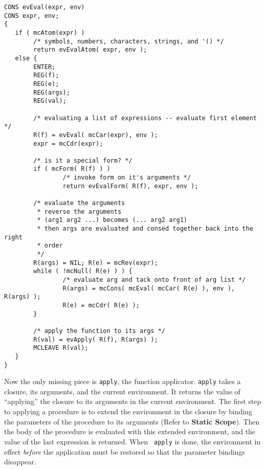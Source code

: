\begin{verbatim}
CONS evEval(expr, env)
CONS expr, env;
{
   if ( mcAtom(expr) )
        /* symbols, numbers, characters, strings, and '() */
        return evEvalAtom( expr, env );
   else {
        ENTER;
        REG(f);
        REG(e);
        REG(args);
        REG(val);

        /* evaluating a list of expressions -- evaluate first element */
        R(f) = evEval( mcCar(expr), env );
        expr = mcCdr(expr);

        /* is it a special form? */
        if ( mcForm( R(f) ) )
                /* invoke form on it's arguments */
                return evEvalForm( R(f), expr, env );

        /* evaluate the arguments
         * reverse the arguments
         * (arg1 arg2 ...) becomes (... arg2 arg1)
         * then args are evaluated and consed together back into the right
         * order
         */
        R(args) = NIL; R(e) = mcRev(expr);
        while ( !mcNull( R(e) ) ) {
                /* evaluate arg and tack onto front of arg list */
                R(args) = mcCons( mcEval( mcCar( R(e) ), env ), R(args) );
                R(e) = mcCdr( R(e) );
        }

        /* apply the function to its args */
        R(val) = evApply( R(f), R(args) );
        MCLEAVE R(val);
   }
}
\end{verbatim}

	Now the only missing piece is {\tt apply}, the function
applicator.  {\tt apply} takes a closure, its arguments, and the current
environment.  It returns the value of ``applying'' the closure to its
arguments in the current environment.  The first step to applying a
procedure is to extend the environment in the closure by binding the
parameters of the procedure to its arguments (Refer to {\bf Static
Scope}).  Then the body of the procedure is evaluated with this extended
environment, and the value of the last expression is returned.  When {\tt
apply} is done, the environment in effect {\em before} the application
must be restored so that the parameter bindings disappear.

